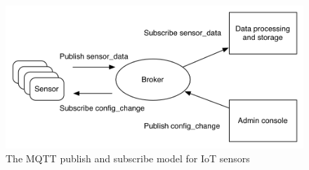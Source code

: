 \begin{figure}[H]
    \centering
    \includegraphics[scale = 0.8]{Images/Chapter 3/mqtt.png}
    \caption{The MQTT publish and subscribe model for IoT sensors}
    \label{fig:mqtt}
\end{figure}
